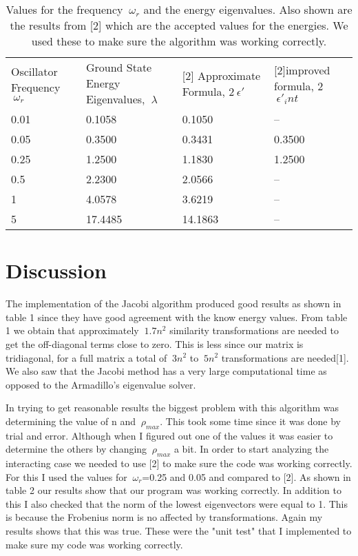 \documentclass[11pt,a4wide]{article}
\begin{document}
\begin{table}[H]
\centering
\label{my-label}
\begin{tabular}{| m{3cm} | m{3cm} | m{3cm} | m{3cm} |}
 \cline{1-4}
 Oscillator Frequency $\ \omega_r$&  Ground State Energy Eigenvalues, $\ \lambda$&  [2] Approximate Formula, 2$\ \epsilon'$&  [2]improved formula, 2$\ \epsilon'_int$ \\ \cline{1-4}
 0.01&  0.1058& 0.1050& --\\ \cline{1-4}
 0.05&  0.3500& 0.3431& 0.3500\\ \cline{1-4}
 0.25&  1.2500& 1.1830& 1.2500\\ \cline{1-4}
 0.5&  2.2300&  2.0566& --\\ \cline{1-4}
 1&  4.0578&    3.6219& --\\ \cline{1-4}
 5&  17.4485&   14.1863& --\\ \cline{1-4}
\end{tabular}
\caption{Values for the frequency $\ \omega_r$ and the energy eigenvalues. Also shown are the results from [2] which are the accepted values for the energies. We used these to make sure the algorithm was working correctly.}
\end{table}

\section{Discussion}
The implementation of the Jacobi algorithm produced good results as shown in table 1 since they have good agreement with the know energy values. From table 1 we obtain that approximately $\ 1.7n^2$ similarity transformations are needed to get the off-diagonal terms close to zero. This is less since our matrix is tridiagonal, for a full matrix a total of $\ 3n^2$ to $\ 5n^2$ transformations are needed[1]. We also saw that the Jacobi method has a very large computational time as opposed to the Armadillo's eigenvalue solver. 

In trying to get reasonable results the biggest problem with this algorithm was determining the value of n and $\ \rho_{max}$. This took some time since it was done by trial and error. Although when I figured out one of the values it was easier to determine the others by changing $\ \rho_{max}$ a bit. In order to start analyzing the interacting case we needed to use [2] to make sure the code was working correctly. For this I used the values for $\ \omega_r $=0.25 and 0.05 and compared to [2]. As shown in table 2 our results show that our program was working correctly. In addition to this I also checked that the norm of the lowest eigenvectors were equal to 1. This is because the Frobenius norm is no affected by transformations. Again my results shows that this was true. These were the "unit test" that I implemented to make sure my code was working correctly.
\end{document}
